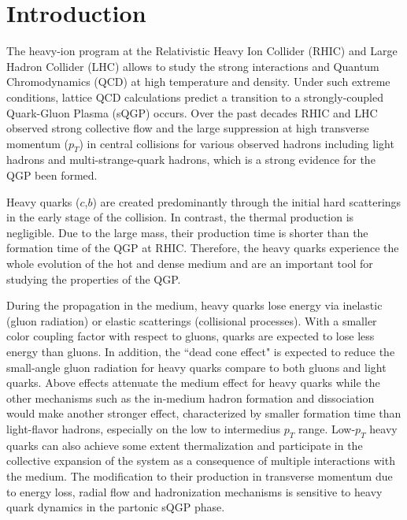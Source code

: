 \documentclass[%
 reprint,
 amsmath,amssymb,
 aps,
]{revtex4-1}
\begin{document}
\section{Introduction}
\label{sec:intro}

The heavy-ion program at the Relativistic Heavy Ion Collider (RHIC) and Large Hadron Collider (LHC) allows to study the strong interactions and Quantum Chromodynamics (QCD) at high temperature and density. Under such extreme conditions, lattice QCD calculations predict a transition to a strongly-coupled Quark-Gluon Plasma (sQGP) occurs. Over the past decades RHIC and LHC observed strong collective flow and the large suppression at high transverse momentum ($p_{T}$) in central collisions for various observed hadrons including light hadrons and multi-strange-quark hadrons, which is a strong evidence for the QGP been formed.

Heavy quarks ($c$,$b$) are created predominantly through the initial hard scatterings in the early stage of the collision. In contrast, the thermal production is negligible. Due to the large mass, their production time is shorter than the formation time of the QGP at RHIC. Therefore, the heavy quarks experience the whole evolution of the hot and dense medium and are an important tool for studying the properties of the QGP. 

During the propagation in the medium, heavy quarks lose energy via inelastic (gluon radiation) or elastic scatterings (collisional processes). With a smaller color coupling factor with respect to gluons, quarks are expected to lose less energy than gluons. In addition, the ``dead cone effect" is expected to reduce the small-angle gluon radiation for heavy quarks compare to both gluons and light quarks. Above effects attenuate the medium effect for heavy quarks while the other mechanisms such as the in-medium hadron formation and dissociation would make another stronger effect, characterized by smaller formation time than light-flavor hadrons, especially on the low to intermedius $p_T$ range. Low-$p_T$ heavy quarks can also achieve some extent thermalization and participate in the collective expansion of the system as a consequence of multiple interactions with the medium. The modification to their production in transverse momentum due to energy loss, radial flow and hadronization mechanisms is sensitive to heavy quark dynamics in the partonic sQGP phase. 
\end{document}
